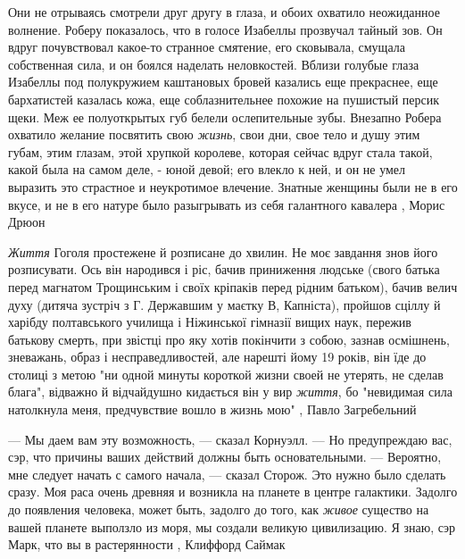 Они не отрываясь смотрели друг другу в глаза, и обоих охватило неожиданное
волнение. Роберу показалось, что в голосе Изабеллы прозвучал тайный зов. Он
вдруг почувствовал какое-то странное смятение, его сковывала, смущала
собственная сила, и он боялся наделать неловкостей. Вблизи голубые глаза
Изабеллы под полукружием каштановых бровей казались еще прекраснее, еще
бархатистей казалась кожа, еще соблазнительнее похожие на пушистый персик щеки.
Меж ее полуоткрытых губ белели ослепительные зубы. Внезапно Робера охватило
желание посвятить свою \emph{жизнь}, свои дни, свое тело и душу этим губам,
этим глазам, этой хрупкой королеве, которая сейчас вдруг стала такой, какой
была на самом деле, - юной девой; его влекло к ней, и он не умел выразить это
страстное и неукротимое влечение. Знатные женщины были не в его вкусе, и не в
его натуре было разыгрывать из себя галантного кавалера
, Морис Дрюон

\emph{Життя} Гоголя простежене й розписане до хвилин. Не моє завдання знов його
розписувати. Ось він народився і ріс, бачив приниження людське (свого батька
перед магнатом Трощинським і своїх кріпаків перед рідним батьком), бачив велич
духу (дитяча зустріч з Г. Державшим у маєтку В, Капніста), пройшов сціллу й
харібду полтавського училища і Ніжинської гімназії вищих наук, пережив батькову
смерть, при звістці про яку хотів покінчити з собою, зазнав осмішнень,
зневажань, образ і несправедливостей, але нарешті йому 19 років, він їде до
столиці з метою "ни одной минуты короткой жизни своей не утерять, не сделав
блага", відважно й відчайдушно кидається він у вир \emph{життя}, бо "невидимая сила
натолкнула меня, предчувствие вошло в жизнь мою"
, Павло Загребельний

— Мы даем вам эту возможность, — сказал Корнуэлл. — Но предупреждаю вас, сэр,
что причины ваших действий должны быть основательными.  — Вероятно, мне следует
начать с самого начала, — сказал Сторож. Это нужно было сделать сразу. Моя раса
очень древняя и возникла на планете в центре галактики. Задолго до появления
человека, может быть, задолго до того, как \emph{живое} существо на вашей планете
выползло из моря, мы создали великую цивилизацию. Я знаю, сэр Марк, что вы в
растерянности
, Клиффорд Саймак

